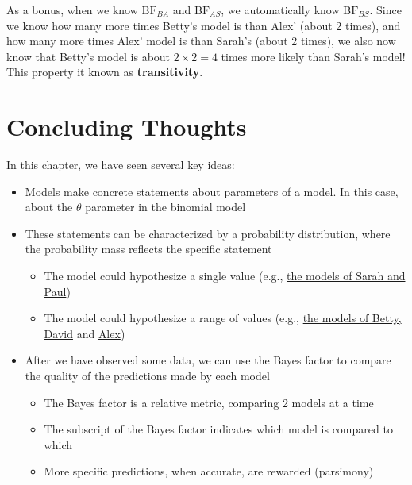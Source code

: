 \documentclass[
]{book}
\providecommand{\tightlist}{%
  \setlength{\itemsep}{0pt}\setlength{\parskip}{0pt}}
\begin{document}
As a bonus, when we know \(\text{BF}_{BA}\) and \(\text{BF}_{AS}\), we automatically know \(\text{BF}_{BS}\). Since we know how many more times Betty's model is than Alex' (about 2 times), and how many more times Alex' model is than Sarah's (about 2 times), we also now know that Betty's model is about \(2 \times 2 = 4\) times more likely than Sarah's model! This property it known as \textbf{transitivity}.

\hypertarget{concluding-thoughts}{%
\section{Concluding Thoughts}\label{concluding-thoughts}}

In this chapter, we have seen several key ideas:

\begin{itemize}
\tightlist
\item
  Models make concrete statements about parameters of a model. In this case, about the \(\theta\) parameter in the binomial model
\item
  These statements can be characterized by a probability distribution, where the probability mass reflects the specific statement

  \begin{itemize}
  \tightlist
  \item
    The model could hypothesize a single value (e.g., \protect\hyperlink{fig:two-models-binomial}{the models of Sarah and Paul})
  \item
    The model could hypothesize a range of values (e.g., \protect\hyperlink{fig:two-models-binomial-onesided}{the models of Betty, David} and \protect\hyperlink{fig:uninformed-model-binomial-prediction}{Alex})
  \end{itemize}
\item
  After we have observed some data, we can use the Bayes factor to compare the quality of the predictions made by each model

  \begin{itemize}
  \tightlist
  \item
    The Bayes factor is a relative metric, comparing 2 models at a time
  \item
    The subscript of the Bayes factor indicates which model is compared to which
  \item
    More specific predictions, when accurate, are rewarded (parsimony)
  \end{itemize}
\end{itemize}
\end{document}
